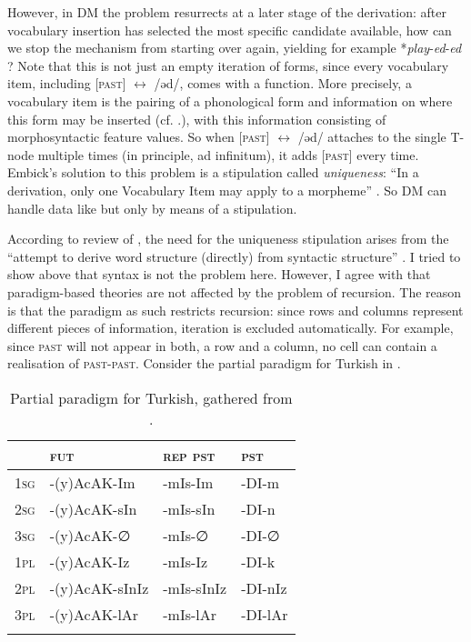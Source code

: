 \documentclass[output=paper]{langsci/langscibook}
\begin{document}
However, in DM the problem resurrects at a later stage of the derivation: after vocabulary insertion has selected the most specific candidate available, how can we stop the mechanism from starting over again, yielding for example *\textit{play}{}-\textit{ed}{}-\textit{ed} \citep[97]{Embick2015}? Note that this is not just an empty iteration of forms, since every vocabulary item, including [\textsc{past}] $\leftrightarrow $ /əd/, comes with a function. More precisely, a vocabulary item is the pairing of a phonological form and information on where this form may be inserted (cf. .), with this information consisting of morphosyntactic feature values. So when [\textsc{past}] $\leftrightarrow $ /əd/ attaches to the single T-node multiple times (in principle, ad infinitum), it adds [\textsc{past}] every time. Embick’s solution to this problem is a stipulation called \textit{uniqueness}: “In a derivation, only one Vocabulary Item may apply to a morpheme” \citep[98]{Embick2015}. So DM can handle data like  but only by means of a stipulation.

According to  review of \citet{Embick2015}, the need for the uniqueness stipulation arises from the “attempt to derive word structure (directly) from syntactic structure” \citep[218]{Spencer2019}. I tried to show above that syntax is not the problem here. However, I agree with \citet{Spencer2019} that paradigm-based theories are not affected by the problem of recursion. The reason is that the paradigm as such restricts recursion: since rows and columns represent different pieces of information, iteration is excluded automatically. For example, since \textsc{past} will not appear in both, a row and a column, no cell can contain a realisation of \textsc{past}{}-\textsc{past}. Consider the partial paradigm for Turkish in .

\begin{table}
\caption{Partial paradigm for Turkish, gathered from \citet[Ch. 2.1.3]{Kornfilt1997}.\label{tab:reiner:12}}
\begin{tabular}{llll}
\lsptoprule
               & {\textsc{fut}} & {\textsc{rep pst}} & {\textsc{pst}}\\\midrule
{\textsc{1sg}} & {}-(y)AcAK{}-Im &     {}-mIs-Im &    {}-DI-m\\
{\textsc{2sg}} & {}-(y)AcAK{}-sIn &    {}-mIs-sIn &   {}-DI-n \\
{\textsc{3sg}} & {}-(y)AcAK{}-∅ &      {}-mIs-∅   &   {}-DI-∅\\
{\textsc{1pl}} & {}-(y)AcAK{}-Iz &     {}-mIs-Iz &    {}-DI-k\\
{\textsc{2pl}} & {}-(y)AcAK{}-sInIz &  {}-mIs-sInIz & {}-DI-nIz\\
{\textsc{3pl}} & {}-(y)AcAK{}-lAr &    {}-mIs-lAr &   {}-DI-lAr\\
\lspbottomrule
\end{tabular}
\end{table}
\end{document}
